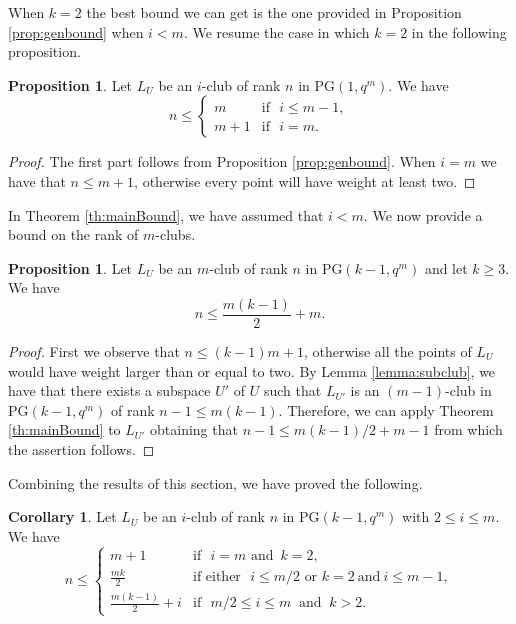 \documentclass[11pt]{amsart}
\theoremstyle{definition}
\newtheorem{corollary}[theorem]{Corollary}
\newtheorem{proposition}[theorem]{Proposition}
\newtheorem{remark}[theorem]{Remark}
\begin{document}
When $k=2$ the best bound we can get is the one provided in Proposition \ref{prop:genbound} when $i<m$. We resume the case in which $k=2$ in the following proposition.

\begin{proposition}
    Let $L_U$ be an $i$-club of rank $n$ in PG$(1,q^m)$. We have
    \[ n\leq  
    \begin{cases}
        m & \text{if }\,\, i\leq m-1,\\
        m+1 & \text{if }\,\, i=m.
    \end{cases}
    \]
\end{proposition}
\begin{proof}
    The first part follows from Proposition \ref{prop:genbound}. When $i=m$ we have that $n\leq m+1$, otherwise every point will have weight at least two. 
\end{proof}


In Theorem \ref{th:mainBound}, we have assumed that $i<m$. We now provide a bound on the rank of $m$-clubs.

\begin{proposition}
    Let $L_U$ be an $m$-club of rank $n$ in PG$(k-1,q^m)$ and let $k\geq 3$. We have
    \[ n\leq  \frac{m(k-1)}2+m.\]
\end{proposition}
\begin{proof}
    First we observe that $n\leq (k-1)m+1$, otherwise all the points of $L_U$ would have weight larger than or equal to two. By Lemma \ref{lemma:subclub}, we have that there exists a subspace $U'$ of $U$ such that $L_{U'}$ is an $(m-1)$-club in PG$(k-1,q^m)$ of rank $n-1\leq m(k-1)$. Therefore, we can apply Theorem \ref{th:mainBound} to $L_{U'}$ obtaining that $n-1\leq m(k-1)/2+m-1$ from which the assertion follows.
\end{proof}

Combining the results of this section, we have proved the following.

\begin{corollary}\label{cor:boundiclub}
    Let $L_U$ be an $i$-club of rank $n$ in PG$(k-1,q^m)$ with $2 \leq i\leq m$. We have
    \[ n\leq  
    \begin{cases}
        m+1 & \text{if }\,\, i= m\,\, \text{and }\, k=2,\\
        \frac{mk}2 & \text{if either }\,\, i\leq m/2 \,\, \text{or } k=2 \ \mbox{and} \ i \leq m-1,\\
        \frac{m(k-1)}2+i & \text{if }\,\, m/2\leq i\leq m \ \mbox{ and }\ k>2.
    \end{cases}
    \]
\end{corollary}
\end{document}
